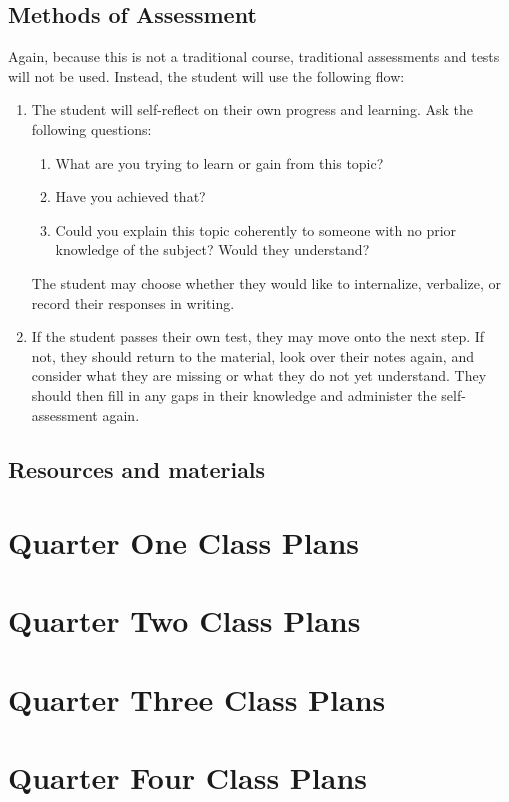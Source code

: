 \documentclass[12pt]{article}
\begin{document}
\subsection{Methods of Assessment}
Again, because this is not a traditional course, traditional assessments and tests will not be used. Instead, the student will use the following flow:
\begin{enumerate}
	\item The student will self-reflect on their own progress and learning. Ask the following questions:
	\begin{enumerate}
		\item What are you trying to learn or gain from this topic?
		\item Have you achieved that?
		\item Could you explain this topic coherently to someone with no prior knowledge of the subject? Would they understand?
	\end{enumerate}
	The student may choose whether they would like to internalize, verbalize, or record their responses in writing. 
	\item If the student passes their own test, they may move onto the next step. If not, they should return to the material, look over their notes again, and consider what they are missing or what they do not yet understand. They should then fill in any gaps in their knowledge and administer the self-assessment again. 
	
\end{enumerate}
\subsection{Resources and materials}

\section{Quarter One Class Plans}
\section{Quarter Two Class Plans}
\section{Quarter Three Class Plans}
\section{Quarter Four Class Plans}
\end{document}
